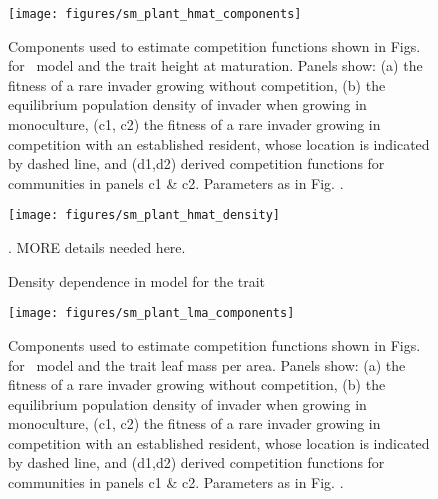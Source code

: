 \documentclass[10pt,twoside]{article}
\begin{document}
\newpage

\begin{figure}[h]
 \centering
 \texttt{[image: figures/sm\_plant\_hmat\_components]}
 \caption{Components used to estimate competition functions shown in Figs. {\figPlantHmat} for \plant\ model and the trait height at maturation. Panels show: (a) the fitness of a rare invader growing without competition, (b) the equilibrium population density of invader when growing in monoculture, (c1, c2) the fitness of a rare invader growing in competition with an established resident, whose location is indicated by dashed line, and (d1,d2) derived competition functions for communities in panels c1 \& c2. Parameters as in Fig. {\figPlantHmat}.}
  \label{fig:sm_plant_hmat_components}
\end{figure}

\newpage

\begin{figure}[h]
  \centering
  \texttt{[image: figures/sm\_plant\_hmat\_density]}
  \caption{Density dependence in \plant model for the trait \hmat}. MORE details needed here.
  \label{fig:plant_hmat_density_dependence}
\end{figure}

\newpage

\begin{figure}[h]
 \centering
 \texttt{[image: figures/sm\_plant\_lma\_components]}
 \caption{Components used to estimate competition functions shown in Figs. {\figPlantLma} for \plant\ model and the trait leaf mass per area. Panels show: (a) the fitness of a rare invader growing without competition, (b) the equilibrium population density of invader when growing in monoculture, (c1, c2) the fitness of a rare invader growing in competition with an established resident, whose location is indicated by dashed line, and (d1,d2) derived competition functions for communities in panels  c1 \& c2. Parameters as in Fig. {\figPlantLma}.} 
 \label{fig:sm_plant_lma_components}
\end{figure}


% 
% 
\end{document}
